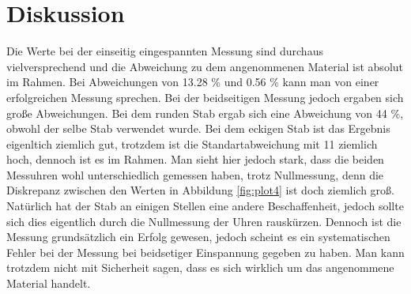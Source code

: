 \section{Diskussion}
\label{sec:Diskussion}
Die Werte bei der einseitig eingespannten Messung sind durchaus vielversprechend
und die Abweichung zu dem angenommenen Material ist absolut im Rahmen.
Bei Abweichungen von 13.28 \% und 0.56 \% kann man von einer erfolgreichen Messung sprechen.
Bei der beidseitigen Messung jedoch ergaben sich große Abweichungen.
Bei dem runden Stab ergab sich eine Abweichung von 44 \%, obwohl der selbe Stab verwendet wurde.
Bei dem eckigen Stab ist das Ergebnis eigenltich ziemlich gut, trotzdem ist die Standartabweichung mit 11
ziemlich hoch, dennoch ist es im Rahmen.
Man sieht hier jedoch stark, dass die beiden Messuhren wohl unterschiedlich gemessen haben,
trotz Nullmessung, denn die Diskrepanz zwischen den Werten in Abbildung \ref{fig:plot4} ist doch ziemlich groß.
Natürlich hat der Stab an einigen Stellen eine andere Beschaffenheit, jedoch sollte sich
dies eigentlich durch die Nullmessung der Uhren rauskürzen.
Dennoch ist die Messung grundsätzlich ein Erfolg gewesen, jedoch scheint es ein systematischen
Fehler bei der Messung bei beidsetiger Einspannung gegeben zu haben.
Man kann trotzdem nicht mit Sicherheit sagen, dass es sich wirklich um das 
angenommene Material handelt.